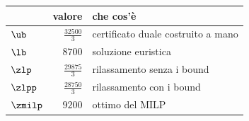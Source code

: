 \begin{center}\small
\begin{tabular}{lrl}
\toprule
 & valore & che cos'è \\
\midrule
$\ub$ & $\frac{32500}{3}$ & certificato duale costruito a mano \\
$\lb$ & $8700$ & soluzione euristica \\
$\zlp$ & $\frac{29875}{3}$ & rilassamento senza i bound \\
$\zlpp$ & $\frac{28750}{3}$ & rilassamento con i bound \\
$\zmilp$ & $9200$ & ottimo del MILP \\
\bottomrule
\end{tabular}
\end{center}

